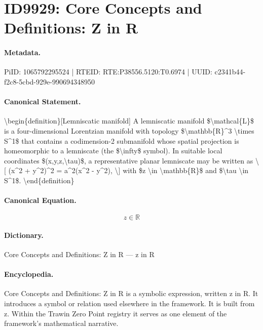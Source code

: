 \section*{ID9929: Core Concepts and Definitions: Z in R}
\paragraph{Metadata.}
PiID: 1065792295524 | RTEID: RTE:P38556.5120:T0.6974 | UUID: c2341b44-f2c8-5cbd-929e-990694348950

\paragraph{Canonical Statement.}
\textbackslash{}begin\{definition\}[Lemniscatic manifold] A lemniscatic manifold \$\textbackslash{}mathcal\{L\}\$ is a four-dimensional Lorentzian manifold with topology \$\textbackslash{}mathbb\{R\}\textasciicircum{}3 \textbackslash{}times S\textasciicircum{}1\$ that contains a codimension-2 submanifold whose spatial projection is homeomorphic to a lemniscate (the \$\textbackslash{}infty\$ symbol). In suitable local coordinates \$(x,y,z,\textbackslash{}tau)\$, a representative planar lemniscate may be written as \textbackslash{}[ (x\textasciicircum{}2 + y\textasciicircum{}2)\textasciicircum{}2 = a\textasciicircum{}2(x\textasciicircum{}2 - y\textasciicircum{}2), \textbackslash{}] with \$z \textbackslash{}in \textbackslash{}mathbb\{R\}\$ and \$\textbackslash{}tau \textbackslash{}in S\textasciicircum{}1\$. \textbackslash{}end\{definition\}

\paragraph{Canonical Equation.}
\[
z \in \mathbb{R}
\]

\paragraph{Dictionary.}
Core Concepts and Definitions: Z in R — z in R

\paragraph{Encyclopedia.}
Core Concepts and Definitions: Z in R is a symbolic expression, written z in R. It introduces a symbol or relation used elsewhere in the framework. It is built from z. Within the Trawin Zero Point registry it serves as one element of the framework's mathematical narrative.
